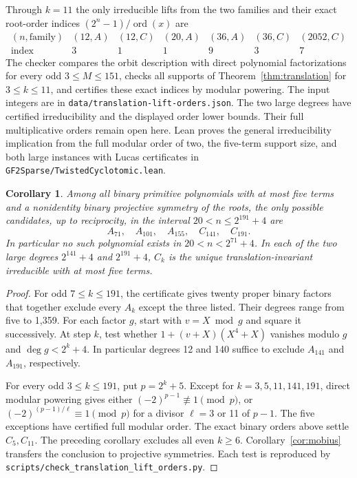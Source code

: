 \documentclass[11pt]{article}
\newtheorem{corollary}[theorem]{Corollary}
\newcommand{\ord}{\operatorname{ord}}
\begin{document}
Through \(k=11\) the only irreducible lifts from the two families
and their exact root-order indices \((2^n-1)/\ord(x)\) are
\[
\begin{array}{c|rrrrrr}
 (n,\text{family}) &(12,A)&(12,C)&(20,A)&(36,A)&(36,C)&(2052,C)\\\hline
 \text{index}&3&1&1&9&3&7
\end{array}
\]
The checker compares the orbit description with direct polynomial
factorizations for every odd \(3\le M\le151\), checks all supports
of Theorem~\ref{thm:translation} for \(3\le k\le11\), and certifies
these exact indices by modular powering. The input integers are in
\nolinkurl{data/translation-lift-orders.json}. The two large degrees
have certified irreducibility and the displayed order lower bounds.
Their full multiplicative orders remain open here. Lean proves the
general irreducibility implication from the full modular order of
two, the five-term support size, and both large instances with Lucas
certificates in \nolinkurl{GF2Sparse/TwistedCyclotomic.lean}.

\begin{corollary}
Among all binary primitive polynomials with at most five terms and
a nonidentity binary projective symmetry of the roots, the only
possible candidates, up to reciprocity, in the interval
\(20<n\le2^{191}+4\) are
\[
                   A_{71},\quad A_{101},\quad A_{155},
                   \quad C_{141},\quad C_{191}.
\]
In particular no such polynomial exists in \(20<n<2^{71}+4\).
In each of the two large degrees \(2^{141}+4\) and \(2^{191}+4\),
\(C_k\) is the unique translation-invariant irreducible with at most
five terms.
\end{corollary}
\begin{proof}
For odd \(7\le k\le191\), the certificate gives twenty proper binary
factors that together exclude every \(A_k\) except the three listed.
Their degrees range from five to 1,359. For each factor \(g\), start
with \(v=X\bmod g\) and square it successively. At step \(k\), test
whether \(1+(v+X)(X^4+X)\) vanishes modulo \(g\) and
\(\deg g<2^k+4\). In particular degrees 12 and 140 suffice to
exclude \(A_{141}\) and \(A_{191}\), respectively.

For every odd \(3\le k\le191\), put \(p=2^k+5\).
Except for \(k=3,5,11,141,191\), direct modular powering gives
either \((-2)^{p-1}\not\equiv1\pmod p\), or
\((-2)^{(p-1)/\ell}\equiv1\pmod p\) for a divisor \(\ell=3\) or 11
of \(p-1\). The five exceptions have certified full modular order.
The exact binary orders above settle \(C_5,C_{11}\).
The preceding corollary excludes all even \(k\ge6\).
Corollary~\ref{cor:mobius} transfers the conclusion to projective
symmetries. Each test is reproduced by
\nolinkurl{scripts/check_translation_lift_orders.py}.
\end{proof}
\end{document}
